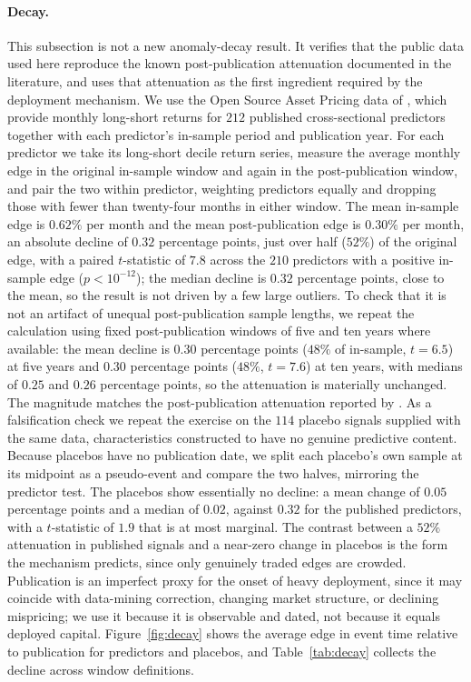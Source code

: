 \documentclass[11pt]{article}
\theoremstyle{plain}
\theoremstyle{definition}
\begin{document}
\paragraph{Decay.}
This subsection is not a new anomaly-decay result. It verifies that the public data used here reproduce the known post-publication attenuation documented in the literature, and uses that attenuation as the first ingredient required by the deployment mechanism. We use the Open Source Asset Pricing data of \citet{chen2020}, which provide monthly long-short returns for $212$ published cross-sectional predictors together with each predictor's in-sample period and publication year. For each predictor we take its long-short decile return series, measure the average monthly edge in the original in-sample window and again in the post-publication window, and pair the two within predictor, weighting predictors equally and dropping those with fewer than twenty-four months in either window. The mean in-sample edge is $0.62\%$ per month and the mean post-publication edge is $0.30\%$ per month, an absolute decline of $0.32$ percentage points, just over half ($52\%$) of the original edge, with a paired $t$-statistic of $7.8$ across the $210$ predictors with a positive in-sample edge ($p<10^{-12}$); the median decline is $0.32$ percentage points, close to the mean, so the result is not driven by a few large outliers. To check that it is not an artifact of unequal post-publication sample lengths, we repeat the calculation using fixed post-publication windows of five and ten years where available: the mean decline is $0.30$ percentage points ($48\%$ of in-sample, $t=6.5$) at five years and $0.30$ percentage points ($48\%$, $t=7.6$) at ten years, with medians of $0.25$ and $0.26$ percentage points, so the attenuation is materially unchanged. The magnitude matches the post-publication attenuation reported by \citet{mclean2016}. As a falsification check we repeat the exercise on the $114$ placebo signals supplied with the same data, characteristics constructed to have no genuine predictive content. Because placebos have no publication date, we split each placebo's own sample at its midpoint as a pseudo-event and compare the two halves, mirroring the predictor test. The placebos show essentially no decline: a mean change of $0.05$ percentage points and a median of $0.02$, against $0.32$ for the published predictors, with a $t$-statistic of $1.9$ that is at most marginal. The contrast between a $52\%$ attenuation in published signals and a near-zero change in placebos is the form the mechanism predicts, since only genuinely traded edges are crowded. Publication is an imperfect proxy for the onset of heavy deployment, since it may coincide with data-mining correction, changing market structure, or declining mispricing; we use it because it is observable and dated, not because it equals deployed capital. Figure~\ref{fig:decay} shows the average edge in event time relative to publication for predictors and placebos, and Table~\ref{tab:decay} collects the decline across window definitions.
\end{document}
